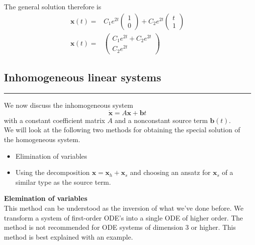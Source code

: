 The general solution therefore is
\begin{equation}
  \begin{split}
    \mathbf{x}(t) =& C_1 e^{2t} \begin{pmatrix} 1 \\ 0\end{pmatrix} +
    C_2 e^{2t} \begin{pmatrix} t \\ 1 \end{pmatrix}\\
    \mathbf{x}(t) =& \begin{pmatrix} C_1 e^{2t} + C_2 e^{2t}\\
    C_2 e^{2t} \end{pmatrix}
  \end{split}
\end{equation}



\subsection{Inhomogeneous linear systems}
\noindent\rule[\linienAbstand]{\linewidth}{\linienDicke}
We now discuss the inhomogeneous system
\begin{equation}
  \dot{\mathbf{x}} = A\mathbf{x} + \mathbf{b}t
\end{equation}
with a constant coefficient matrix $A$ and a nonconstant source term $\mathbf{b}(t)$.\\
We will look at the following two methods for obtaining the special solution of the homogeneous system.
\begin{itemize}
  \item Elimination of variables
  \item Using the decomposition $\mathbf{x} = \mathbf{x}_h + \mathbf{x}_s$ and choosing an ansatz for $\mathbf{x}_s$ of a similar type as the source term.
\end{itemize}

\textbf{Elemination of variables}\\
This method can be understood as the inversion of what we've done before. We transform a system of first-order ODE’s into a single ODE of higher order. The method is not recommended for ODE systems of dimension 3 or higher. This method is best explained with an example.\\

